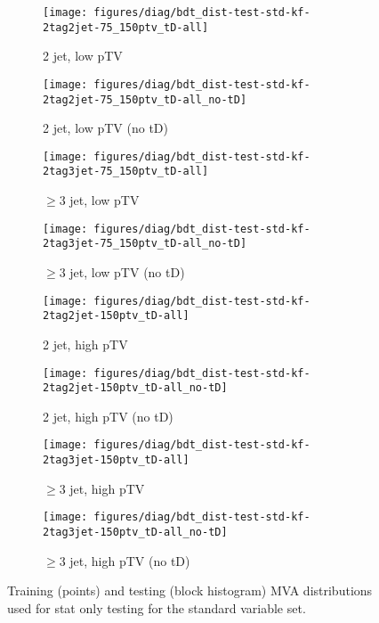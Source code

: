 {\begin{figure}[!htbp]\captionsetup{justification=centering}
  \centering
  \begin{subfigure}[t]{0.49\textwidth}\centering\texttt{[image: figures/diag/bdt\_dist-test-std-kf-2tag2jet-75\_150ptv\_tD-all]}\caption{2 jet, low pTV}\end{subfigure}
  \begin{subfigure}[t]{0.49\textwidth}\centering\texttt{[image: figures/diag/bdt\_dist-test-std-kf-2tag2jet-75\_150ptv\_tD-all\_no-tD]}\caption{2 jet, low pTV (no tD)}\end{subfigure}
  \begin{subfigure}[t]{0.49\textwidth}\centering\texttt{[image: figures/diag/bdt\_dist-test-std-kf-2tag3jet-75\_150ptv\_tD-all]}\caption{$\ge3$ jet, low pTV}\end{subfigure}
  \begin{subfigure}[t]{0.49\textwidth}\centering\texttt{[image: figures/diag/bdt\_dist-test-std-kf-2tag3jet-75\_150ptv\_tD-all\_no-tD]}\caption{$\ge3$ jet, low pTV (no tD)}\end{subfigure}
  \begin{subfigure}[t]{0.49\textwidth}\centering\texttt{[image: figures/diag/bdt\_dist-test-std-kf-2tag2jet-150ptv\_tD-all]}\caption{2 jet, high pTV}\end{subfigure}
  \begin{subfigure}[t]{0.49\textwidth}\centering\texttt{[image: figures/diag/bdt\_dist-test-std-kf-2tag2jet-150ptv\_tD-all\_no-tD]}\caption{2 jet, high pTV (no tD)}\end{subfigure}
  \begin{subfigure}[t]{0.49\textwidth}\centering\texttt{[image: figures/diag/bdt\_dist-test-std-kf-2tag3jet-150ptv\_tD-all]}\caption{$\ge3$ jet, high pTV}\end{subfigure}
  \begin{subfigure}[t]{0.49\textwidth}\centering\texttt{[image: figures/diag/bdt\_dist-test-std-kf-2tag3jet-150ptv\_tD-all\_no-tD]}\caption{$\ge3$ jet, high pTV (no tD)}\end{subfigure}
  \caption{Training (points) and testing (block histogram) MVA distributions used for stat only testing for the standard variable set.}
  \label{fig:std-kf-testing}
\end{figure}

}
